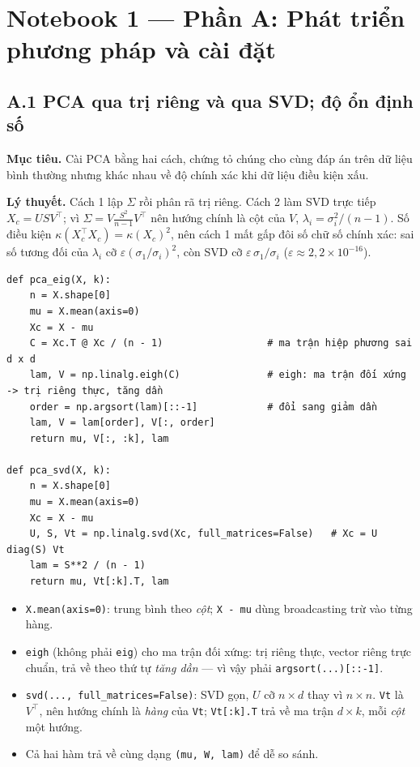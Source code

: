 \documentclass[11pt,a4paper]{article}
\newcommand{\code}[1]{\texttt{#1}}
\begin{document}
\section{Notebook 1 — Phần A: Phát triển phương pháp và cài đặt}

\subsection{A.1 PCA qua trị riêng và qua SVD; độ ổn định số}
\textbf{Mục tiêu.} Cài PCA bằng hai cách, chứng tỏ chúng cho cùng đáp án trên dữ liệu bình thường nhưng khác nhau về độ chính xác khi dữ liệu điều kiện xấu.

\textbf{Lý thuyết.} Cách 1 lập $\Sigma$ rồi phân rã trị riêng. Cách 2 làm SVD trực tiếp $X_c=USV^\top$; vì $\Sigma=V\frac{S^2}{n-1}V^\top$ nên hướng chính là cột của $V$, $\lambda_i=\sigma_i^2/(n-1)$. Số điều kiện $\kappa(X_c^\top X_c)=\kappa(X_c)^2$, nên cách 1 mất gấp đôi số chữ số chính xác: sai số tương đối của $\lambda_i$ cỡ $\varepsilon(\sigma_1/\sigma_i)^2$, còn SVD cỡ $\varepsilon\,\sigma_1/\sigma_i$ ($\varepsilon\approx2{,}2\times10^{-16}$).

\begin{verbatim}
def pca_eig(X, k):
    n = X.shape[0]
    mu = X.mean(axis=0)
    Xc = X - mu
    C = Xc.T @ Xc / (n - 1)                  # ma trận hiệp phương sai d x d
    lam, V = np.linalg.eigh(C)               # eigh: ma trận đối xứng -> trị riêng thực, tăng dần
    order = np.argsort(lam)[::-1]            # đổi sang giảm dần
    lam, V = lam[order], V[:, order]
    return mu, V[:, :k], lam

def pca_svd(X, k):
    n = X.shape[0]
    mu = X.mean(axis=0)
    Xc = X - mu
    U, S, Vt = np.linalg.svd(Xc, full_matrices=False)   # Xc = U diag(S) Vt
    lam = S**2 / (n - 1)
    return mu, Vt[:k].T, lam
\end{verbatim}
\begin{itemize}
\item \code{X.mean(axis=0)}: trung bình theo \emph{cột}; \code{X - mu} dùng broadcasting trừ vào từng hàng.
\item \code{eigh} (không phải \code{eig}) cho ma trận đối xứng: trị riêng thực, vector riêng trực chuẩn, trả về theo thứ tự \emph{tăng dần} — vì vậy phải \code{argsort(...)[::-1]}.
\item \code{svd(..., full\_matrices=False)}: SVD gọn, $U$ cỡ $n\times d$ thay vì $n\times n$. \code{Vt} là $V^\top$, nên hướng chính là \emph{hàng} của \code{Vt}; \code{Vt[:k].T} trả về ma trận $d\times k$, mỗi \emph{cột} một hướng.
\item Cả hai hàm trả về cùng dạng \code{(mu, W, lam)} để dễ so sánh.
\end{itemize}
\end{document}
